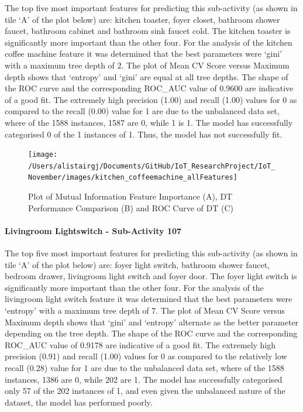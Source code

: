 \documentclass[11pt,]{article}
\let\oldparagraph\paragraph
\renewcommand{\paragraph}[1]{\oldparagraph{#1}\mbox{}}
\begin{document}
The top five most important features for predicting this sub-activity
(as shown in tile `A' of the plot below) are: kitchen toaster, foyer
closet, bathroom shower faucet, bathroom cabinet and bathroom sink
faucet cold. The kitchen toaster is significantly more important than
the other four. For the analysis of the kitchen coffee machine feature
it was determined that the best parameters were `gini' with a maximum
tree depth of 2. The plot of Mean CV Score versus Maximum depth shows
that `entropy' and `gini' are equal at all tree depths. The shape of the
ROC curve and the corresponding ROC\_AUC value of 0.9600 are indicative
of a good fit. The extremely high precision (1.00) and recall (1.00)
values for 0 as compared to the recall (0.00) value for 1 are due to the
unbalanced data set, where of the 1588 instances, 1587 are 0, while 1 is
1. The model has successfully categorised 0 of the 1 instances of 1.
Thus, the model has not successfully fit.

\begin{figure}[H]

{\centering \texttt{[image: /Users/alistairgj/Documents/GitHub/IoT\_ResearchProject/IoT\_November/images/kitchen\_coffeemachine\_allFeatures]} 

}

\caption{Plot of Mutual Information Feature Importance (A), DT Performance Comparison (B) and ROC Curve of DT (C)}\label{fig:unnamed-chunk-23}
\end{figure}

\hypertarget{livingroom-lightswitch---sub-activity-107-1}{%
\paragraph{Livingroom Lightswitch - Sub-Activity
107}\label{livingroom-lightswitch---sub-activity-107-1}}

The top five most important features for predicting this sub-activity
(as shown in tile `A' of the plot below) are: foyer light switch,
bathroom shower faucet, bedroom drawer, livingroom light switch and
foyer door. The foyer light switch is significantly more important than
the other four. For the analysis of the livingroom light switch feature
it was determined that the best parameters were `entropy' with a maximum
tree depth of 7. The plot of Mean CV Score versus Maximum depth shows
that `gini' and `entropy' alternate as the better parameter depending on
the tree depth. The shape of the ROC curve and the corresponding
ROC\_AUC value of 0.9178 are indicative of a good fit. The extremely
high precision (0.91) and recall (1.00) values for 0 as compared to the
relatively low recall (0.28) value for 1 are due to the unbalanced data
set, where of the 1588 instances, 1386 are 0, while 202 are 1. The model
has successfully categorised only 57 of the 202 instances of 1, and even
given the unbalanced nature of the dataset, the model has performed
poorly.
\end{document}

